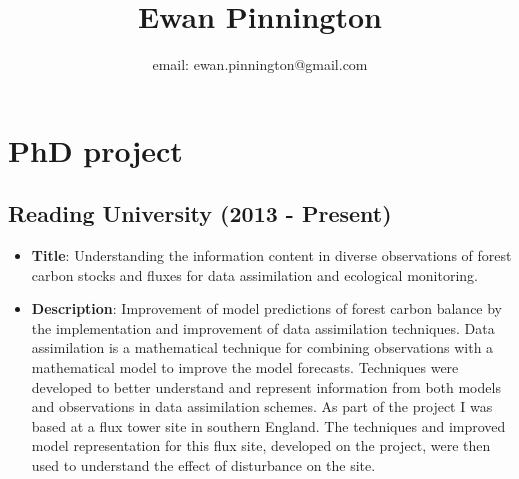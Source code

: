 \documentclass[11pt]{article}
\title{Ewan Pinnington}
\date{}
\author{email: ewan.pinnington@gmail.com}
\begin{document}
\maketitle

\section*{PhD project}
\subsection*{Reading University (2013 - Present) }
\begin{itemize}
\item \textbf{Title}: Understanding the information content in diverse observations of forest carbon stocks and fluxes for data assimilation and ecological monitoring.
\item \textbf{Description}: Improvement of model predictions of forest carbon balance by the implementation and improvement of data assimilation techniques. Data assimilation is a mathematical technique for combining observations with a mathematical model to improve the model forecasts. Techniques were developed to better understand and represent information from both models and observations in data assimilation schemes. As part of the project I was based at a flux tower site in southern England. The techniques and improved model representation for this flux site, developed on the project, were then used to understand the effect of disturbance on the site. 
\end{itemize}
\end{document}
